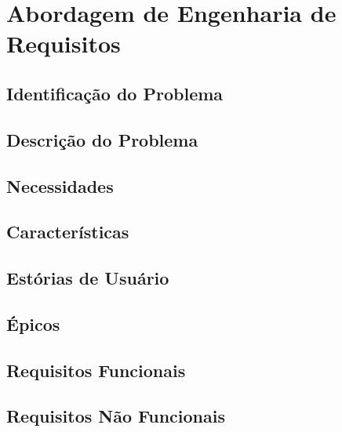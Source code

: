 \chapter{Abordagem de Engenharia de Requisitos}

  \section{Identificação do Problema}

  \section{Descrição do Problema}

  \section{Necessidades}

  \section{Características}

  \section{Estórias de Usuário}

  \section{Épicos}

  \section{Requisitos Funcionais}

  \section{Requisitos Não Funcionais}
